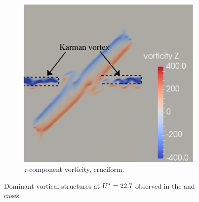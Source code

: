 \documentclass[oneside]{utmthesis}
\begin{document}
\begin{figure}
  \begin{subfigure}[h]{0.6\textwidth}
    \centering
    \includegraphics[width=\textwidth]{figs/vorz45}
    \caption{$z$-component vorticity, \angth{} cruciform.}
    \label{fig:vorz45}
  \end{subfigure}
  \caption{Dominant vortical structures at $U^{*} = 22.7$ observed in the \angfo{} and \angth{} cases.} \label{fig:vortStruct67545}
\end{figure}
\end{document}
